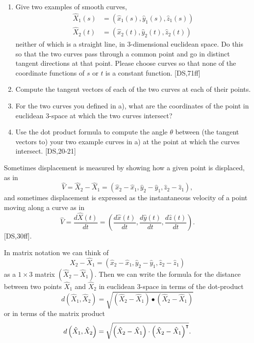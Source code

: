 \documentclass{ximera}
\begin{document}
\begin{problem}\hfil
\begin{enumerate}
\label{1}\item Give two examples of smooth curves,
\begin{align*}
\hat{X}_{1}\left(  s\right)   &  =\left(  \hat{x}_{1}\left(  s\right)
,\hat{y}_{1}\left(  s\right)  ,\hat{z}_{1}\left(  s\right)  \right) \\
\hat{X}_{2}\left(  t\right)   &  =\left(  \hat{x}_{2}\left(  t\right)
,\hat{y}_{2}\left(  t\right)  ,\hat{z}_{2}\left(  t\right)  \right)
\end{align*}
neither of which is a straight line, in $3$-dimensional euclidean space. Do
this so that the two curves pass through a common point and go in distinct
tangent directions at that point. Please choose curves so that none of the
coordinate functions of $s$ or $t$ is a constant function. [DS,71ff]

\item Compute the tangent vectors of each of the two curves at each of their points.

\item For the two curves you defined in a), what are the coordinates of the point
in euclidean $3$-space at which the two curves intersect?

\item Use the dot product formula to compute the angle $\theta$ between (the
tangent vectors to) your two example curves in a) at the point at which the
curves intersect. [DS,20-21]
\end{enumerate}
\end{problem}

Sometimes displacement is measured by showing how a given point is displaced,
as in%
\[
\hat{V}=\hat{X}_{2}-\hat{X}_{1}=\left(  \hat{x}_{2}-\hat{x}_{1},\hat{y}%
_{2}-\hat{y}_{1},\hat{z}_{2}-\hat{z}_{1}\right)  ,
\]
and sometimes displacement is expressed as the instantaneous velocity of a
point moving along a curve as in%
\[
\hat{V}=\frac{d\hat{X}\left(  t\right)  }{dt}=\left(  \frac{d\hat{x}\left(
t\right)  }{dt},\frac{d\hat{y}\left(  t\right)  }{dt},\frac{d\hat{z}\left(
t\right)  }{dt}\right)  .
\]
[DS,30ff].

In matrix notation we can think of
\[
\hat{X}_{2}-\hat{X}_{1}=\left(  \hat{x}_{2}-\hat{x}_{1},\hat{y}_{2}-\hat
{y}_{1},\hat{z}_{2}-\hat{z}_{1}\right)
\]
as a $1\times3$ matrix $\left(  \hat{X}_{2}-\hat{X}_{1}\right)  $. Then we can
write the formula for the distance between two points $\hat{X}_{1}$ and
$\hat{X}_{2}$ in euclidean $3$-space in terms of the dot-product%
\begin{equation}
d\left(  \hat{X}_{1},\hat{X}_{2}\right)  =\sqrt{\left(  \hat{X}_{2}-\hat
{X}_{1}\right)  \bullet\left(  \hat{X}_{2}-\hat{X}_{1}\right)  } \label{13}%
\end{equation}
or in terms of the matrix product%
\[
d\left(  \hat{X}_{1},\hat{X}_{2}\right)  
=\sqrt{\left( \hat{X}_{2}-\hat{X}_{1} \right)  \cdot\left(\hat{X}_{2}-\hat{X}%
_{1}\right)  ^\transpose }.
\]
\end{document}
